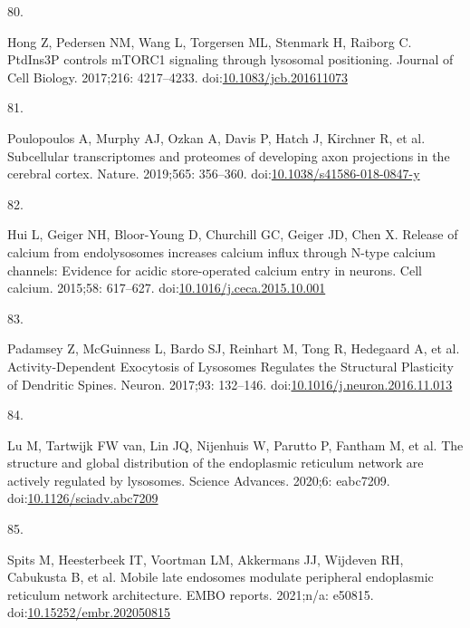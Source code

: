 \documentclass[
  12pt,
  a4paper,
]{book}
\newlength{\cslhangindent}
\newlength{\csllabelwidth}
\newlength{\cslentryspacingunit} %
\newenvironment{CSLReferences}[2] %
 {%
  \setlength{\parindent}{0pt}
  \ifodd #1
  \let\oldpar\par
  \def\par{\hangindent=\cslhangindent\oldpar}
  \fi
  \setlength{\parskip}{#2\cslentryspacingunit}
 }%
 {}
\newcommand{\CSLLeftMargin}[1]{\parbox[t]{\csllabelwidth}{#1}}
\newcommand{\CSLRightInline}[1]{\parbox[t]{\linewidth - \csllabelwidth}{#1}\break}
\begin{document}
\begin{CSLReferences}{0}{0}
\leavevmode{}%
\CSLLeftMargin{80. }%
\CSLRightInline{Hong Z, Pedersen NM, Wang L, Torgersen ML, Stenmark H, Raiborg C. {PtdIns3P} controls {mTORC1} signaling through lysosomal positioning. Journal of Cell Biology. 2017;216: 4217--4233. doi:\href{https://doi.org/10.1083/jcb.201611073}{10.1083/jcb.201611073}}

\leavevmode{}%
\CSLLeftMargin{81. }%
\CSLRightInline{Poulopoulos A, Murphy AJ, Ozkan A, Davis P, Hatch J, Kirchner R, et al. Subcellular transcriptomes and proteomes of developing axon projections in the cerebral cortex. Nature. 2019;565: 356--360. doi:\href{https://doi.org/10.1038/s41586-018-0847-y}{10.1038/s41586-018-0847-y}}

\leavevmode{}%
\CSLLeftMargin{82. }%
\CSLRightInline{Hui L, Geiger NH, Bloor-Young D, Churchill GC, Geiger JD, Chen X. Release of calcium from endolysosomes increases calcium influx through {N-type} calcium channels: {Evidence} for acidic store-operated calcium entry in neurons. Cell calcium. 2015;58: 617--627. doi:\href{https://doi.org/10.1016/j.ceca.2015.10.001}{10.1016/j.ceca.2015.10.001}}

\leavevmode{}%
\CSLLeftMargin{83. }%
\CSLRightInline{Padamsey Z, McGuinness L, Bardo SJ, Reinhart M, Tong R, Hedegaard A, et al. Activity-{Dependent Exocytosis} of {Lysosomes Regulates} the {Structural Plasticity} of {Dendritic Spines}. Neuron. 2017;93: 132--146. doi:\href{https://doi.org/10.1016/j.neuron.2016.11.013}{10.1016/j.neuron.2016.11.013}}

\leavevmode{}%
\CSLLeftMargin{84. }%
\CSLRightInline{Lu M, Tartwijk FW van, Lin JQ, Nijenhuis W, Parutto P, Fantham M, et al. The structure and global distribution of the endoplasmic reticulum network are actively regulated by lysosomes. Science Advances. 2020;6: eabc7209. doi:\href{https://doi.org/10.1126/sciadv.abc7209}{10.1126/sciadv.abc7209}}

\leavevmode{}%
\CSLLeftMargin{85. }%
\CSLRightInline{Spits M, Heesterbeek IT, Voortman LM, Akkermans JJ, Wijdeven RH, Cabukusta B, et al. Mobile late endosomes modulate peripheral endoplasmic reticulum network architecture. EMBO reports. 2021;n/a: e50815. doi:\href{https://doi.org/10.15252/embr.202050815}{10.15252/embr.202050815}}


\end{CSLReferences}
\end{document}
